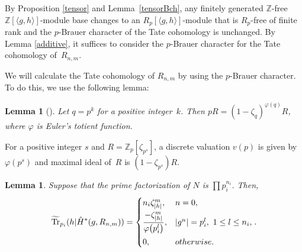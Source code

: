 \documentclass[10pt,a4paper]{amsart}
\numberwithin{equation}{section}
\newtheorem{Lemma}[Theorem]{Lemma}
\begin{document}
By Proposition \ref{tensor} and Lemma~\ref{tensorBch}, any finitely generated $\mathbb{Z}$-free $\mathbb{Z}[\langle g,h \rangle]$-module base changes to an $R_p[\langle g,h \rangle]$-module that is $R_p$-free of finite rank and the $p$-Brauer character of the Tate cohomology is unchanged.
By Lemma \ref{additive}, it suffices to consider the $p$-Brauer character for the Tate cohomology of~$R_{n,m}$.

We will calculate the Tate cohomology of $R_{n,m}$ by using the $p$-Brauer character. To do this, we use the following lemma:

\begin{Lemma}[{\cite[Chapter III, Lemma 3]{CF}}] \label{pR}
 Let $q=p^k$ for a positive integer~$k$. Then $pR=(1-\zeta_q)^{\varphi(q)}R$, where $\varphi$ is Euler's totient function.
\end{Lemma}

For a positive integer $s$ and $R=\mathbb{Z}_{p}[\zeta_{p^s}]$, a discrete valuation $v(p)$ is given by $\varphi(p^s)$ and maximal ideal of~$R$ is $(1-\zeta_{p^s})R$.

\begin{Lemma}\label{Bch}
Suppose that the prime factorization of $N$ is $\prod p_i^{n_i}$.
Then,
\[
\widetilde{\operatorname{Tr}}_{p_i}(h|\hat{H}^*(g,R_{n,m}))= \begin{cases}
n_i\zeta_{|h|}^m, & n=0, \vspace{1mm}\\
\dfrac{-\zeta_{|h|}^m}{\varphi \big(p_i^l\big)}, & |g^n|=p_i^l, \ 1\leq l\leq n_i, \vspace{1mm}\\
0, & otherwise.
\end{cases}.
\]
\end{Lemma}
\end{document}
